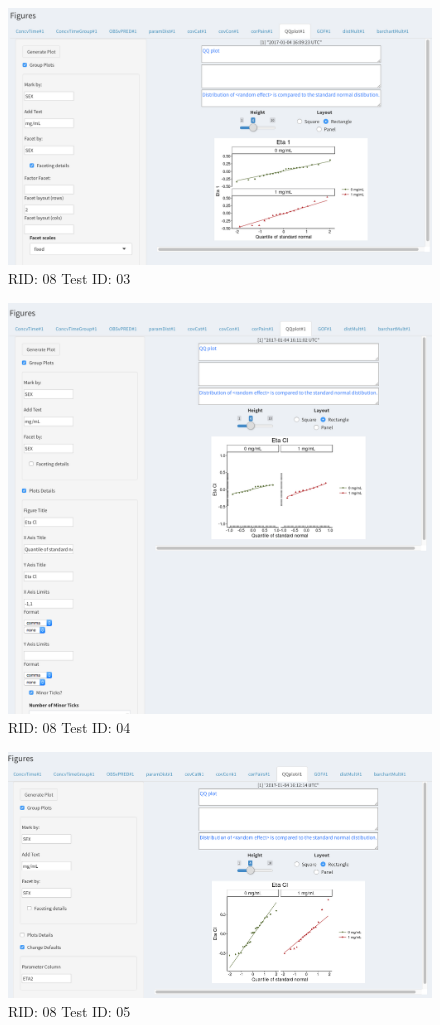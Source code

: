 \begin{figure}[H]
\includegraphics[width=.8\textwidth]{screencaps/08-03-1.png}
\caption{RID: 08 Test ID: 03}
\end{figure}
\begin{figure}[H]
\includegraphics[width=.8\textwidth]{screencaps/08-04-1.png}
\caption{RID: 08 Test ID: 04}
\end{figure}
\begin{figure}[H]
\includegraphics[width=.8\textwidth]{screencaps/08-05-1.png}
\caption{RID: 08 Test ID: 05}
\end{figure}
